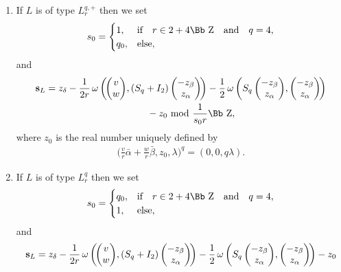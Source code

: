 \documentclass[10pt,a4paper]{amsart}
\newcommand\ZZ{{\mbox{\Bb Z}}}
\newcommand\bs{\textbf{{\rm \textbf{s}}}}
\numberwithin{equation}{section}
\begin{document}
\begin{Definition}
\begin{enumerate}
\begin{enumerate}
\item[$(a)$] If $L$ is of type $L^{q,+}_r$ then we set
\begin{gather*}
s_0=\begin{cases}
1,& \text{if}\quad r\in 2+4\ZZ \quad\text{and}\quad q=4,
\\
q_0,& \text{else},
\end{cases}
\end{gather*}
and
\begin{gather*}
\bs_L=z_\delta -\frac{1}{2r}\,\omega\left(\!\begin{pmatrix}v\\w\end{pmatrix}\!, (S_q+I_2)\begin{pmatrix}-z_\beta\\z_\alpha\end{pmatrix}\!\right)
-\frac{1}{2}\,\omega\left(S_q\begin{pmatrix}-z_\beta\\z_\alpha\end{pmatrix}\!, \begin{pmatrix}-z_\beta\\z_\alpha\end{pmatrix}\!\right)
\\ \hphantom{\bs_L=}
{}-z_0\ {\rm mod}\ \frac{1}{s_0r}\ZZ,
\end{gather*}
where $z_0$ is the real number uniquely defined by
\begin{gather*}
\bigg(\frac{v}{r}\bar\alpha+\frac{w}{r}\bar\beta,z_0,\lambda\bigg)^q=(0,0,q\lambda).
\end{gather*}
\item[$(b)$] If $L$ is of type $L^q_r$ then we set
\begin{gather*}
s_0=\begin{cases}
q_0,& \text{if}\quad r\in 2+4\ZZ\quad\text{and}\quad q=4,
\\
1,& \text{else},
\end{cases}
\end{gather*}
and
\begin{gather*}
\bs_L=z_\delta
 -\frac{1}{2r}\,\omega\left(\!\begin{pmatrix}v\\w\end{pmatrix}\!, (S_q+I_2)\begin{pmatrix}-z_\beta\\z_\alpha\end{pmatrix}\!\right)
-\frac{1}{2}\,\omega\left(S_q\begin{pmatrix}-z_\beta\\z_\alpha\end{pmatrix}\!, \begin{pmatrix}-z_\beta\\z_\alpha\end{pmatrix}\!\right)-z_0

\end{gather*}
\end{enumerate}
\end{enumerate}
\end{Definition}
\end{document}
